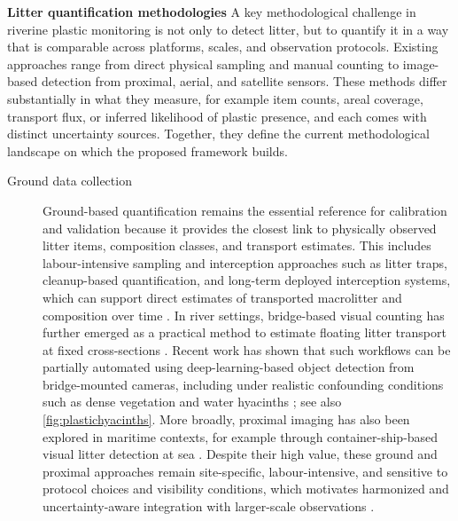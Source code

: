 \documentclass{scrartcl}
\begin{document}
\textbf{Litter quantification methodologies} A key methodological challenge in riverine plastic monitoring is not only to detect litter, but to quantify it in a way that is comparable across platforms, scales, and observation protocols. Existing approaches range from direct physical sampling and manual counting to image-based detection from proximal, aerial, and satellite sensors. These methods differ substantially in what they measure, for example item counts, areal coverage, transport flux, or inferred likelihood of plastic presence, and each comes with distinct uncertainty sources. Together, they define the current methodological landscape on which the proposed framework builds.

\begin{description}
    \item[Ground data collection]
    Ground-based quantification remains the essential reference for calibration and validation because it provides the closest link to physically observed litter items, composition classes, and transport estimates. This includes labour-intensive sampling and interception approaches such as litter traps, cleanup-based quantification, and long-term deployed interception systems, which can support direct estimates of transported macrolitter and composition over time \citep{gnann2026river,martinezvicente2019measuring,vighi2022monitoring}. In river settings, bridge-based visual counting has further emerged as a practical method to estimate floating litter transport at fixed cross-sections \citep{van2022hydrology}. Recent work has shown that such workflows can be partially automated using deep-learning-based object detection from bridge-mounted cameras, including under realistic confounding conditions such as dense vegetation and water hyacinths \citep{vanlieshout2020automated,hagenbeek5841770exploring}; see also \cref{fig:plastichyacinths}. More broadly, proximal imaging has also been explored in maritime contexts, for example through container-ship-based visual litter detection at sea \citep{de2021quantifying}. Despite their high value, these ground and proximal approaches remain site-specific, labour-intensive, and sensitive to protocol choices and visibility conditions, which motivates harmonized and uncertainty-aware integration with larger-scale observations \citep{vriend2025uncertainties,vanemmerik2023harmonized,blettler2026macroplastic}.


\end{description}
\end{document}
